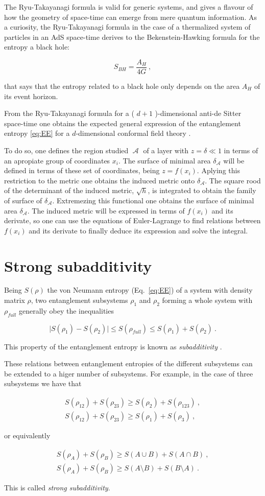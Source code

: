 \documentclass[twocolumn]{revtex4}
\providecommand{\abs}[1]{\lvert#1\rvert}
\providecommand{\eq}[2]{
    \begin{equation}
        #2
    \label{eq:#1}
    \end{equation}
}
\providecommand{\eqgat}[2]{
    \begin{gather}
        #2
    \label{eq:#1}
    \end{gather}
}
\DeclareMathOperator{\calA}{\mathcal{A}}
\begin{document}
The Ryu-Takayanagi formula is valid for generic systems, and gives a flavour of how the geometry of space-time can emerge from mere quantum information. As a curiosity, the Ryu-Takayanagi formula in the case of a thermalized system of particles in an AdS space-time derives to the Bekenstein-Hawking formula \cite{bekenstein_black_1973} for the entropy a black hole:
\eq{BH}{
    S_{BH} = \frac{ A_H }{ 4 G } \ ,
}
that says that the entropy related to a black hole only depends on the area $A_H$ of its event horizon.

From the Ryu-Takayanagi formula for a ( $d+1$ )-dimensional anti-de Sitter space-time one obtains the expected general expression of the entanglement entropy \ref{eq:EE} for a $d$-dimensional conformal field theory \cite{}.

To do so, one defines the region studied $\calA$ of a layer with $z = \delta \ll 1$ in terms of an apropiate group of coordinates $x_i$. The surface of minimal area $\delta_{\calA}$ will be defined in terms of these set of coordinates, being $z = f (x_i)$. Aplying this restriction to the metric one obtains the induced metric onto $\delta_{\calA}$. The square rood of the determinant of the induced metric, $\sqrt{h}$, is integrated to obtain the family of surface of $\delta_{\calA}$. Extremezing this functional one obtains the surface of minimal area $\delta_{\calA}$. The induced metric will be expressed in terms of $f(x_i)$ and its derivate, so one can use the equations of Euler-Lagrange to find relations between $f (x_i)$ and its derivate to finally deduce its expression and solve the integral.


\section{Strong subadditivity} \label{s:SS}

Being $S(\rho)$ the von Neumann entropy (Eq.~\ref{eq:EE}) of a system with density matrix $\rho$, two entanglement subsystems $\rho_1$ and $\rho_2$ forming a whole system with $\rho_{full}$ generally obey the inequalities
\eq{EE_subadd}{
    \abs{S(\rho_1)-S(\rho_2)} \le S(\rho_{full}) \le S(\rho_1) + S(\rho_2) \ .
}
This property of the entanglement entropy is known as \textit{subadditivity} \cite{headrick_holographic_2007}.

These relations between entanglement entropies of the different subsystems can be extended to a higer number of subsystems. For example, in the case of three subsystems we have that
\eqgat{EE_strong-subadd}{
    S(\rho_{12}) + S(\rho_{23}) \ge S(\rho_2) + S(\rho_{123}) \ , \nonumber \\
    S(\rho_{12}) + S(\rho_{23}) \ge S(\rho_1) + S(\rho_3) \ ,
}
or equivalently
\eqgat{EE_strong-subadd-2}{
    S(\rho_{A}) + S(\rho_{B}) \ge S(A \cup B) + S(A \cap B) \ , \nonumber \\
    S(\rho_{A}) + S(\rho_{B}) \ge S(A \setminus B) + S(B \setminus A) \ .
}
This is called \textit{strong subadditivity}.
\end{document}
